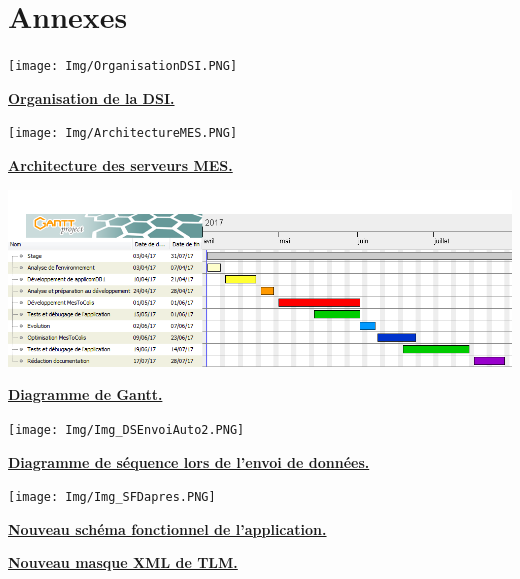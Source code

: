 \documentclass[a4paper,12pt]{extarticle}
\newcommand{\espace}{\vspace{0.3cm}}
\begin{document}
	\section{Annexes}
	
		\begin{center}
	\centerline{\texttt{[image: Img/OrganisationDSI.PNG]}}
	\espace{}
	\centerline{\textbf{\underline{Organisation de la DSI.}}}
		\end{center}
	
	\clearpage
	
		\begin{center}
	\centerline{\texttt{[image: Img/ArchitectureMES.PNG]}}
	\espace{}
	\centerline{\textbf{\underline{Architecture des serveurs MES.}}}
		\end{center}
	
	\clearpage
	
		\begin{center}
	\centerline{\includegraphics[scale=0.5,angle=270]{DiagrammeDeGantt}}
	\espace{}
	\centerline{\textbf{\underline{Diagramme de Gantt.}}}
		\end{center}
	
	\clearpage
	
		\begin{center}
	\centerline{\texttt{[image: Img/Img\_DSEnvoiAuto2.PNG]}}
	\espace{}
	\centerline{\textbf{\underline{Diagramme de séquence lors de l'envoi de données.}}}
		\end{center}
		
	\clearpage
	
		\begin{center}
	\centerline{\texttt{[image: Img/Img\_SFDapres.PNG]}}
	\espace{}
	\centerline{\textbf{\underline{Nouveau schéma fonctionnel de l'application.}}}
		\end{center}
	
	\clearpage
	
		\begin{center}
			
			\centerline{\textbf{\underline{Nouveau masque XML de TLM.}}}
		\end{center}
	
	\clearpage
	
\end{document}
